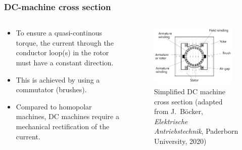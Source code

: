 \begin{frame}
	\frametitle{DC-machine cross section}
    \begin{columns}
		\begin{column}{0.42\textwidth}
            \begin{itemize}
				\item To ensure a quasi-continous torque, the current through the conductor loop(s) in the rotor must have a constant direction.
				\item<2-> This is achieved by using a commutator (brushes).
				\item<3-> Compared to homopolar machines, DC machines require a mechanical rectification of the current.
			\end{itemize}
		\end{column}
        \hfill
		\begin{column}{0.55\textwidth}
			\begin{figure}
				\centering
				\includegraphics[width=0.925\textwidth]{fig/lec03/DC_machine_cross_section.pdf}
				\caption{Simplified DC machine cross section (adapted from J.~B\"ocker, \textit{Elektrische Antriebstechnik}, Paderborn University, 2020)}
				\label{fig:DC_machine_cross_section}
			\end{figure}
		\end{column}
		\end{columns}
\end{frame}

